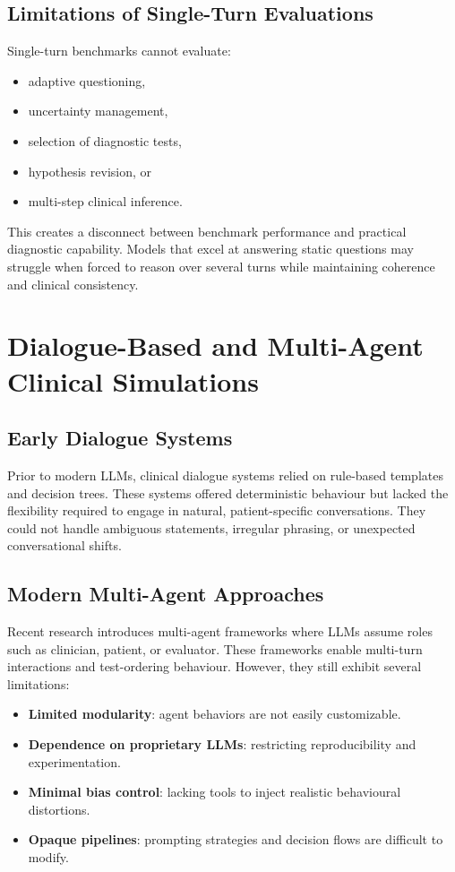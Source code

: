 \subsection{Limitations of Single-Turn Evaluations}

Single-turn benchmarks cannot evaluate:  
\begin{itemize}
    \item adaptive questioning,  
    \item uncertainty management,  
    \item selection of diagnostic tests,  
    \item hypothesis revision, or  
    \item multi-step clinical inference.
\end{itemize}

This creates a disconnect between benchmark performance and practical diagnostic capability. Models that excel at answering static questions may struggle when forced to reason over several turns while maintaining coherence and clinical consistency.

\section{Dialogue-Based and Multi-Agent Clinical Simulations}

\subsection{Early Dialogue Systems}

Prior to modern LLMs, clinical dialogue systems relied on rule-based templates and decision trees. These systems offered deterministic behaviour but lacked the flexibility required to engage in natural, patient-specific conversations. They could not handle ambiguous statements, irregular phrasing, or unexpected conversational shifts.

\subsection{Modern Multi-Agent Approaches}

Recent research introduces multi-agent frameworks where LLMs assume roles such as clinician, patient, or evaluator. These frameworks enable multi-turn interactions and test-ordering behaviour. However, they still exhibit several limitations:
\begin{itemize}
    \item \textbf{Limited modularity}: agent behaviors are not easily customizable.
    \item \textbf{Dependence on proprietary LLMs}: restricting reproducibility and experimentation.
    \item \textbf{Minimal bias control}: lacking tools to inject realistic behavioural distortions.
    \item \textbf{Opaque pipelines}: prompting strategies and decision flows are difficult to modify.
\end{itemize}

